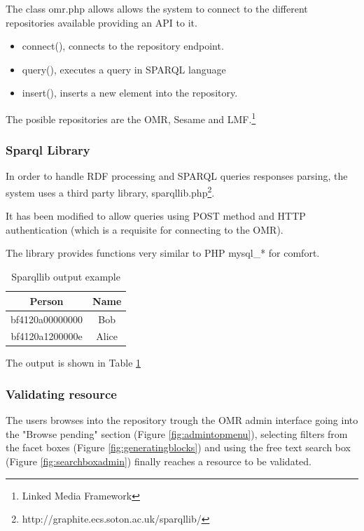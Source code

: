 The class omr.php allows allows the system to connect to the different repositories available providing an API to it.
\begin{itemize}
	\item connect(), connects to the repository endpoint.
	\item query(), executes a query in SPARQL language
	\item insert(), inserts a new element into the repository.
\end{itemize}

The posible repositories are the OMR, Sesame and LMF.\footnote{Linked Media Framework}


\subsubsection{Sparql Library}
\label{subsubsec:sparqllibrary}
In order to handle RDF processing and SPARQL queries responses parsing, the system uses a third party library, sparqllib.php\footnote{http://graphite.ecs.soton.ac.uk/sparqllib/}.

It has been modified to allow queries using POST method and HTTP authentication (which is a requisite for connecting to the OMR).

The library provides functions very similar to PHP mysql\_* for comfort.



\begin {table}[ht!]
\caption {Sparqllib output example} \label{tab:sparqllibsample} 
\begin{center}
	\begin{tabular}{|c|c|}
		\hline 
		Person          & Name  \\ 
		\hline 
		bf4120a00000000 & Bob   \\ 
		\hline 
		bf4120a1200000e & Alice \\ 
		\hline 
	\end{tabular}
\end{center}
\end{table}
The output is shown in Table \ref{tab:sparqllibsample}

\newpage

\subsubsection{Validating resource}
\label{subsubsection:validationresourcearch}
The users browses into the repository trough the OMR admin interface going into the "Browse pending" section (Figure \ref{fig:admintopmenu}), selecting filters from the facet boxes (Figure \ref{fig:generatingblocks}) and using the free text search box (Figure \ref{fig:searchboxadmin}) finally reaches a resource to be validated. 

